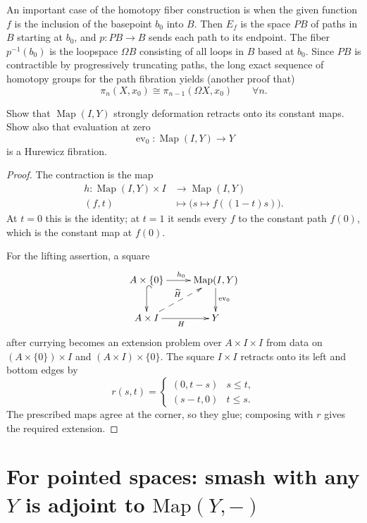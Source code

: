\begin{definition}
\label{definition-path-fibration}
An important case of the homotopy fiber
construction
is when the given function $f$ is the
inclusion of the basepoint $b_0$ into $B$.
Then $E_{f}$ is the space $PB$ of paths in
$B$ starting at $b_{0}$,
and $p:PB\to B$ sends each path to its
endpoint.
The fiber $p^{-1}(b_{0})$ is the loopspace
$\Omega B$
consisting of all loops in  $B$ based at
$b_{0}$.
Since $PB$ is contractible by progressively
truncating paths,
the long exact sequence of homotopy groups
for the path
fibration yields (another proof that)
$$
\pi_{n}(X,x_{0})\cong \pi_{n-1}(\Omega
X,x_{0})\qquad \forall n.
$$

\begin{exercise}
Show that $\operatorname{Map}(I,Y)$
strongly deformation retracts onto its
constant maps. Show also that evaluation
at zero
$$
\operatorname{ev}_0:
\operatorname{Map}(I,Y)
\longrightarrow Y
$$
is a Hurewicz fibration.
\end{exercise}

\begin{proof}
The contraction is the map
$$
\begin{aligned}
h:\operatorname{Map}(I,Y)\times I
&\longrightarrow\operatorname{Map}(I,Y)\\
(f,t)&\longmapsto
 \bigl(s\mapsto f((1-t)s)\bigr).
\end{aligned}
$$
At $t=0$ this is the identity; at $t=1$
it sends every $f$ to the constant path
$f(0)$, which is the constant map at
$f(0)$.

For the lifting assertion, a square
$$
\xymatrix{
A\times\{0\}\ar@{^{(}->}[d]
 \ar[r]^{h_0}
&\operatorname{Map}(I,Y)\ar[d]^{\operatorname{ev}_0}\\
A\times I\ar[r]_{H}
 \ar@{-->}[ur]^{\widetilde H}
&Y
}
$$
after currying becomes an extension
problem over $A\times I\times I$
from data on
$(A\times\{0\})\times I$ and
$(A\times I)\times\{0\}$.
The square $I\times I$ retracts onto its
left and bottom edges by
$$
r(s,t)=
\begin{cases}
(0,t-s)&s\leq t,\\
(s-t,0)&t\leq s.
\end{cases}
$$
The prescribed maps agree at the corner,
so they glue; composing with $r$ gives
the required extension.
\end{proof}

\end{definition}

\section{For pointed spaces: smash with any
\texorpdfstring{$Y$}{Y}
is adjoint to
\texorpdfstring{$\text{Map}(Y,-)$}{Map(Y,-)}}
\label{section-point-space-smash-any-y}


